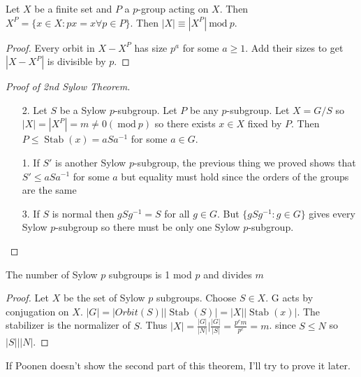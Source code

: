 \documentclass{article}
\renewcommand{\mod}[1]{\ \text{mod}\ #1}
\DeclareMathOperator{\Stab}{Stab}
\begin{document}
\begin{lemma}
Let $X$ be a finite set and $P$ a $p$-group acting on $X$. Then $X^P=\{x\in X:px=x\forall p\in P\}$. Then $|X|\equiv|X^P|\mod{p}$. 
\end{lemma}
\begin{proof}
Every orbit in $X-X^P$ has size $p^a$ for some $a\geq 1$. Add their sizes to get $|X-X^P|$ is divisible by $p$. 
\end{proof}
\begin{proof}[Proof of 2nd Sylow Theorem]
\begin{enumerate}
    \item[2.] Let $S$ be a Sylow $p$-subgroup. Let $P$ be any $p$-subgroup. Let $X=G/S$ so $|X|=|X^P|=m\neq 0(\mod{p})$ so there exists $x\in X$ fixed by $P$. Then $P\leq \Stab(x)=aSa^{-1}$ for some $a\in G$.
    \item[1.] If $S'$ is another Sylow $p$-subgroup, the previous thing we proved shows that $S'\leq aSa^{-1}$ for some $a$ but equality must hold since the orders of the groups are the same
    \item[3.] If $S$ is normal then $gSg^{-1}=S$ for all $g\in G$. But $\{gSg^{-1}:g\in G\}$ gives every Sylow $p$-subgroup so there must be only one Sylow $p$-subgroup.
\end{enumerate}
\end{proof}
\begin{theorem}
The number of Sylow $p$ subgroups is 1 mod $p$ and divides $m$
\end{theorem}
\begin{proof}
Let $X$ be the set of Sylow $p$ subgroups. Choose $S\in X$. G acts by conjugation on $X$. $|G|=|Orbit(S)||\Stab(S)|=|X||\Stab(x)|$. The stabilizer is the normalizer of $S$. Thus $|X|=\frac{|G|}{|N|}|\frac{|G|}{|S|}=\frac{p^em}{p^e}=m$.  since $S\leq N$ so $|S|||N|$.
\end{proof}
\begin{remark}
If Poonen doesn't show the second part of this theorem, I'll try to prove it later.
\end{remark}
\end{document}
